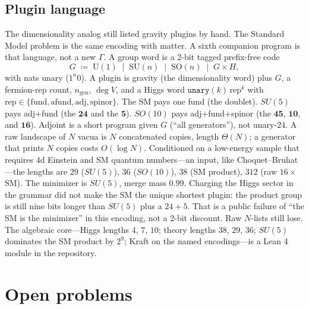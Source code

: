 \documentclass[11pt,a4paper]{article}
\theoremstyle{plain}
\theoremstyle{definition}
\theoremstyle{remark}
\begin{document}
\subsection{Plugin language}

The dimensionality analog still listed gravity plugins by hand.
The Standard Model problem is the same encoding with matter.
A sixth companion program is that language, not a new $\Gamma$.
A group word is a 2-bit tagged prefix-free code
\begin{equation}
  G \;\coloneqq\; \mathrm{U}(1) \;\mid\; \mathrm{SU}(n) \;\mid\; \mathrm{SO}(n) \;\mid\; G\times H,
\end{equation}
with nats unary ($1^{n}0$).
A plugin is gravity (the dimensionality word) plus $G$, a fermion-rep count, $n_{\mathrm{gen}}$, $\deg V$, and a Higgs word $\mathtt{unary}(k)\,\mathrm{rep}^{k}$ with $\mathrm{rep}\in\{\mathrm{fund},\mathrm{afund},\mathrm{adj},\mathrm{spinor}\}$.
The SM pays one fund (the doublet).
$SU(5)$ pays adj$+$fund (the $\mathbf{24}$ and the $\mathbf{5}$).
$SO(10)$ pays adj$+$fund$+$spinor (the $\mathbf{45}$, $\mathbf{10}$, and $\mathbf{16}$).
Adjoint is a short program given $G$ (``all generators''), not unary-$24$.
A raw landscape of $N$ vacua is $N$ concatenated copies, length $\Theta(N)$; a generator that prints $N$ copies costs $O(\log N)$.
Conditioned on a low-energy sample that requires $4$d Einstein and SM quantum numbers---an input, like Choquet--Bruhat---the lengths are $29$ ($SU(5)$), $36$ ($SO(10)$), $38$ (SM product), $312$ (raw $16\times$SM).
The minimizer is $SU(5)$, merge mass $0.99$.
Charging the Higgs sector in the grammar did not make the SM the unique shortest plugin: the product group is still nine bits longer than $SU(5)$ plus a $24{+}5$.
That is a public failure of ``the SM is the minimizer'' in this encoding, not a 2-bit discount.
Raw $N$-lists still lose.
The algebraic core---Higgs lengths $4$, $7$, $10$; theory lengths $38$, $29$, $36$; $SU(5)$ dominates the SM product by $2^{9}$; Kraft on the named encodings---is a Lean 4 module in the repository.

\section{Open problems}
\end{document}

